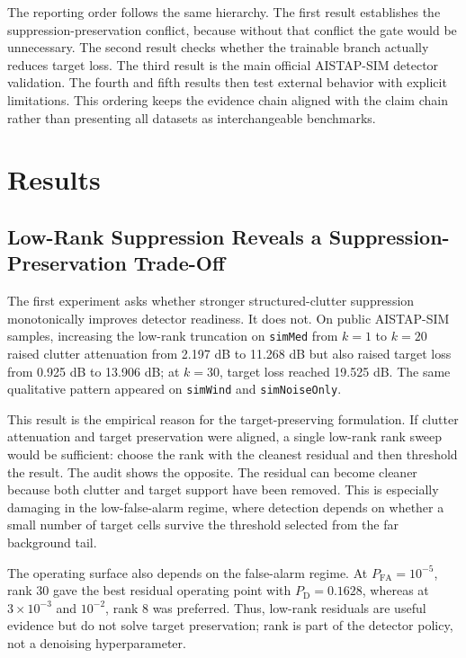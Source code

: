 \documentclass[journal]{IEEEtran}
\begin{document}
The reporting order follows the same hierarchy. The first result establishes the suppression-preservation conflict, because without that conflict the gate would be unnecessary. The second result checks whether the trainable branch actually reduces target loss. The third result is the main official AISTAP-SIM detector validation. The fourth and fifth results then test external behavior with explicit limitations. This ordering keeps the evidence chain aligned with the claim chain rather than presenting all datasets as interchangeable benchmarks.

\section{Results}

\subsection{Low-Rank Suppression Reveals a Suppression-Preservation Trade-Off}

The first experiment asks whether stronger structured-clutter suppression monotonically improves detector readiness. It does not. On public AISTAP-SIM samples, increasing the low-rank truncation on \texttt{simMed} from $k=1$ to $k=20$ raised clutter attenuation from 2.197 dB to 11.268 dB but also raised target loss from 0.925 dB to 13.906 dB; at $k=30$, target loss reached 19.525 dB. The same qualitative pattern appeared on \texttt{simWind} and \texttt{simNoiseOnly}.

This result is the empirical reason for the target-preserving formulation. If clutter attenuation and target preservation were aligned, a single low-rank rank sweep would be sufficient: choose the rank with the cleanest residual and then threshold the result. The audit shows the opposite. The residual can become cleaner because both clutter and target support have been removed. This is especially damaging in the low-false-alarm regime, where detection depends on whether a small number of target cells survive the threshold selected from the far background tail.

The operating surface also depends on the false-alarm regime. At $P_{\mathrm{FA}}=10^{-5}$, rank 30 gave the best residual operating point with $P_{\mathrm{D}}=0.1628$, whereas at $3\times10^{-3}$ and $10^{-2}$, rank 8 was preferred. Thus, low-rank residuals are useful evidence but do not solve target preservation; rank is part of the detector policy, not a denoising hyperparameter.
\end{document}
